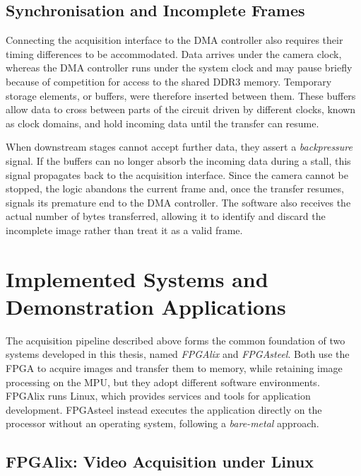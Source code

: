 \subsection{Synchronisation and Incomplete Frames}

Connecting the acquisition interface to the DMA controller also requires their timing differences to be accommodated. Data arrives under the camera clock, whereas the DMA controller runs under the system clock and may pause briefly because of competition for access to the shared DDR3 memory. Temporary storage elements, or buffers, were therefore inserted between them. These buffers allow data to cross between parts of the circuit driven by different clocks, known as clock domains, and hold incoming data until the transfer can resume.

When downstream stages cannot accept further data, they assert a \emph{backpressure} signal. If the buffers can no longer absorb the incoming data during a stall, this signal propagates back to the acquisition interface. Since the camera cannot be stopped, the logic abandons the current frame and, once the transfer resumes, signals its premature end to the DMA controller. The software also receives the actual number of bytes transferred, allowing it to identify and discard the incomplete image rather than treat it as a valid frame.

\section{Implemented Systems and Demonstration Applications}

The acquisition pipeline described above forms the common foundation of two systems developed in this thesis, named \emph{FPGAlix} and \emph{FPGAsteel}. Both use the FPGA to acquire images and transfer them to memory, while retaining image processing on the MPU, but they adopt different software environments. FPGAlix runs Linux, which provides services and tools for application development. FPGAsteel instead executes the application directly on the processor without an operating system, following a \emph{bare-metal} approach.

\subsection{FPGAlix: Video Acquisition under Linux}

